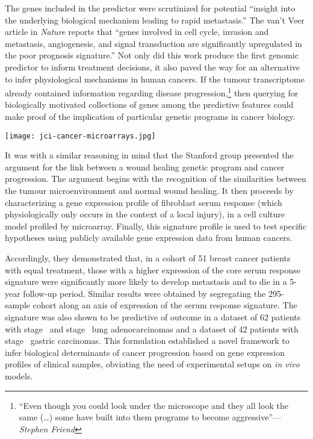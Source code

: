 The genes included in the predictor were scrutinized for potential ``insight
into the underlying biological mechanism leading to rapid metastasis.''  The
van't Veer article in \emph{Nature} reports that ``genes involved in cell cycle,
invasion and metastasis, angiogenesis, and signal transduction are significantly
upregulated in the poor prognosis signature.''  Not only did this work produce
the first genomic predictor to inform treatment decisions, it also paved the way
for an alternative to infer physiological mechanisms in human cancers.  If the
tumour transcriptome already contained information regarding disease
progression,\footnote{``Even though you could look under the microscope and they
  all look the same (\ldots{}) some have built into them programs to become
  aggressive''---\emph{Stephen Friend}} then querying for biologically motivated
collections of genes among the predictive features could make proof of the
implication of particular genetic programs in cancer biology.


\begin{marginfigure}%
  \texttt{[image: jci-cancer-microarrays.jpg]}
  \caption{Cover of \emph{The Journal of Clinical Investigation} of June
    1\textsuperscript{st}, 2005.}
  \label{fig:cancer-microarray}
\end{marginfigure}

It was with a similar reasoning in mind that the Stanford group presented the
argument for the link between a wound healing genetic program and cancer
progression.\cite{chang_gene_2004} The argument begins with the recognition of
the similarities between the tumour microenvironment and normal wound healing.
It then proceeds by characterizing a gene expression profile of fibroblast serum
response (which physiologically only occurs in the context of a local injury),
in a cell culture model profiled by microarray.  Finally, this signature profile
is used to test specific hypotheses using publicly available gene expression
data from human cancers.

Accordingly, they demonstrated that, in a cohort of 51
breast cancer patients with equal treatment, those with a higher expression of
the core serum response signature were significantly more likely to develop
metastasis and to die in a \mbox{5-year} \mbox{follow-up} period.  Similar
results were obtained by segregating the \mbox{295-sample} 
cohort along an axis of expression of the serum response signature.  The
signature was also shown to be predictive of outcome in a dataset of 62 patients
with \mbox{stage } and \mbox{stage } lung
adenocarcinomas\cite{garber_diversity_2001} and a dataset of 42 patients with
\mbox{stage } gastric carcinomas.\cite{leung_phospholipase_2002}
This formulation established a novel framework to infer biological determinants
of cancer progression based on gene expression profiles of clinical samples,
obviating the need of experimental setups on \emph{in vivo} models.

